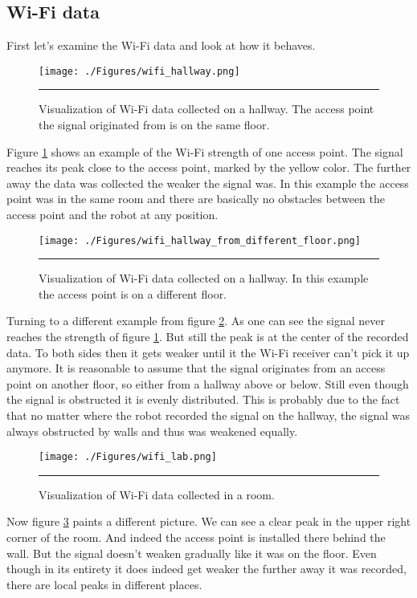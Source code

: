 \subsection{Wi-Fi data}\label{sec:wifidata}
First let's examine the Wi-Fi data and look at how it behaves. 
\begin{figure}[htbp]
	\centering
		\texttt{[image: ./Figures/wifi\_hallway.png]}
		\rule{35em}{0.5pt}
	\caption[Hallway Wi-Fi data]{Visualization of Wi-Fi data collected on a hallway. The access point the signal originated from is on the same floor.}
	\label{fig:hallway_same_floor_wifi}
\end{figure}
Figure \ref{fig:hallway_same_floor_wifi} shows an example of the Wi-Fi strength of one access point. The signal reaches its peak close to the access point, marked by the yellow color. The further away the data was collected the weaker the signal was. In this example the access point was in the same room and there are basically no obstacles between the access point and the robot at any position. 
\begin{figure}[htbp]
	\centering
		\texttt{[image: ./Figures/wifi\_hallway\_from\_different\_floor.png]}
		\rule{35em}{0.5pt}
	\caption[Hallway Wi-Fi data]{Visualization of Wi-Fi data collected on a hallway. In this example the access point is on a different floor.}
	\label{fig:hallway_different_floor_wifi}
\end{figure}
Turning to a different example from figure \ref{fig:hallway_different_floor_wifi}. As one can see the signal never reaches the strength of figure \ref{fig:hallway_same_floor_wifi}. But still the peak is at the center of the recorded data. To both sides then it gets weaker until it the Wi-Fi receiver can't pick it up anymore. It is reasonable to assume that the signal originates from an access point on another floor, so either from a hallway above or below. Still even though the signal is obstructed it is evenly distributed. This is probably due to the fact that no matter where the robot recorded the signal on the hallway, the signal was always obstructed by walls and thus was weakened equally. 

\begin{figure}[htbp]
	\centering
		\texttt{[image: ./Figures/wifi\_lab.png]}
		\rule{35em}{0.5pt}
	\caption[Hallway Wi-Fi data]{Visualization of Wi-Fi data collected in a room.}
	\label{fig:wifi_lab}
\end{figure}
Now figure \ref{fig:wifi_lab} paints a different picture. We can see a clear peak in the upper right corner of the room. And indeed the access point is installed there behind the wall. But the signal doesn't weaken gradually like it was on the floor. Even though in its entirety it does indeed get weaker the further away it was recorded, there are local peaks in different places. 

